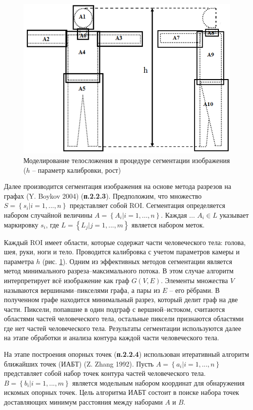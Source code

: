 \begin{figure}[ht!]
\centering
\includegraphics [width=0.45\linewidth] {images/h111.png}
\begin{center}
\caption{Моделирование телосложения в процедуре сегментации изображения ($h$  -- параметр калибровки, рост)} \label{img1}
\end{center}
\end{figure}
Далее производится сегментация изображения на основе метода разрезов на графах (Y. Boykov 2004) (\textbf{п.2.2.3}). Предположим, что множество $S=\left\{s_i|i=1, ..., n\right\}$ представляет собой ROI. Сегментация определяется набором случайной величины $A=\left\{A_i|i=1, ..., n\right\}$. Каждая ...  $A_i\in L$ указывает маркировку $s_i$, где $L=\left\{L_j|j=1, ..., m\right\}$ является набором меток.

Каждый ROI имеет области, которые содержат части человеческого тела: голова, шея, руки, ноги и тело. Проводится калибровка с учетом параметров камеры и параметра $h$ (рис. \ref{img1}). Одним из эффективных методов сегментации является метод минимального разреза\;--\;максимального потока. В этом случае алгоритм интерпретирует всё изображение как граф $G\left(V, E\right)$. Элементы множества $V$ называются вершинами\;--\;пикселями графа, а пары из $E$ -- его рёбрами. В полученном графе находится минимальный разрез, который делит граф на две части. Пиксели, попавшие в один подграф с вершной--истоком, считаются областями частей человеческого тела, остальные пиксели признаются областями где нет частей человеческого тела. Результаты сегментации используются далее на этапе обработки и анализа контура каждой части человеческого тела.

На этапе построения опорных точек (\textbf{п.2.2.4}) использован итеративный алгоритм ближайших точек (ИАБТ) (Z. Zhang 1992). Пусть $A=\left\{a_i| i=1, ..., n\right\}$ представляет собой набор точек контура частей человеческого тела. $B=\left\{b_i| i=1, ..., m\right\}$ является модельным набором координат для обнаружения искомых опорных точек. Цель алгоритма ИАБТ состоит в поиске набора точек доставляющих минимум расстояния между наборами $A$ и $B$.

